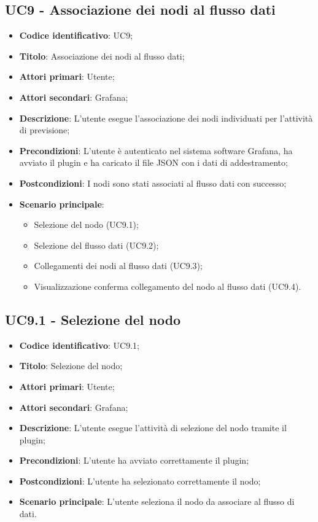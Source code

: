 \subsection{UC9 - Associazione dei nodi al flusso dati}
\begin{itemize}
	\item \textbf{Codice identificativo}: UC9;
	\item \textbf{Titolo}: Associazione dei nodi al flusso dati;
	\item \textbf{Attori primari}: Utente;
	\item \textbf{Attori secondari}: Grafana\glo;
	\item \textbf{Descrizione}: L'utente esegue l'associazione dei nodi individuati per l'attività di previsione;
	\item \textbf{Precondizioni}: L'utente è autenticato nel sistema software Grafana\glosp, ha avviato il plugin e ha caricato il file JSON con i dati di addestramento;
	\item \textbf{Postcondizioni}: I nodi sono stati associati al flusso dati con successo;
	\item \textbf{Scenario principale}: 
		\begin{itemize}
			\item Selezione del nodo (UC9.1);
			\item Selezione del flusso dati (UC9.2);
			\item Collegamenti dei nodi al flusso dati (UC9.3);
			\item Visualizzazione conferma collegamento del nodo al flusso dati (UC9.4).
		\end{itemize}
\end{itemize}

\subsection{UC9.1 - Selezione del nodo}
\begin{itemize}
	\item \textbf{Codice identificativo}: UC9.1;
	\item \textbf{Titolo}: Selezione del nodo;
	\item \textbf{Attori primari}: Utente;
	\item \textbf{Attori secondari}: Grafana\glo;
	\item \textbf{Descrizione}: L'utente esegue l'attività di selezione del nodo tramite il plugin;
	\item \textbf{Precondizioni}: L'utente ha avviato correttamente il plugin;
	\item \textbf{Postcondizioni}: L'utente ha selezionato correttamente il nodo;
	\item \textbf{Scenario principale}: L'utente seleziona il nodo da associare al flusso di dati.
\end{itemize}

